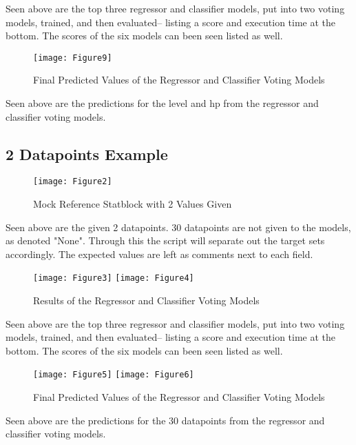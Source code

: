 \documentclass[11pt]{article}
\begin{document}
Seen above are the top three regressor and classifier models, put into two voting models, trained, and then evaluated-- listing a score and execution time at the bottom. The scores of the six models can been seen listed as well.

\begin{figure}[H]
    \centering
    \texttt{[image: Figure9]}
    \caption{Final Predicted Values of the Regressor and Classifier Voting Models}
\end{figure}

Seen above are the predictions for the level and hp from the regressor and classifier voting models.

\subsection{2 Datapoints Example}

\begin{figure}[H]
    \centering
    \texttt{[image: Figure2]}
    \caption{Mock Reference Statblock with 2 Values Given}
\end{figure}

Seen above are the given 2 datapoints. 30 datapoints are not given to the models, as denoted "None". Through this the script will separate out the target sets accordingly. The expected values are left as comments next to each field.

\begin{figure}[H]
    \centering
    \texttt{[image: Figure3]}
    \texttt{[image: Figure4]}
    \caption{Results of the Regressor and Classifier Voting Models}
\end{figure}

Seen above are the top three regressor and classifier models, put into two voting models, trained, and then evaluated-- listing a score and execution time at the bottom. The scores of the six models can been seen listed as well.

\begin{figure}[H]
    \centering
    \texttt{[image: Figure5]}
    \texttt{[image: Figure6]}
    \caption{Final Predicted Values of the Regressor and Classifier Voting Models}
\end{figure}

Seen above are the predictions for the 30 datapoints from the regressor and classifier voting models.
\end{document}
